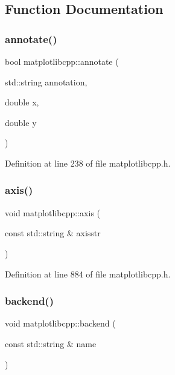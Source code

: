 \subsection{Function Documentation}
\mbox{\label{namespacematplotlibcpp_a4854fc237468144bd46809ea7ce8f2a0}} 
\subsubsection{\texorpdfstring{annotate()}{annotate()}}
{\footnotesize\ttfamily bool matplotlibcpp\+::annotate (\begin{DoxyParamCaption}\item[{std\+::string}]{annotation,  }\item[{double}]{x,  }\item[{double}]{y }\end{DoxyParamCaption})\hspace{0.3cm}{\ttfamily [inline]}}



Definition at line 238 of file matplotlibcpp.\+h.

\mbox{\label{namespacematplotlibcpp_aab5287e30ebd90df0f5614d8da0f5291}} 
\subsubsection{\texorpdfstring{axis()}{axis()}}
{\footnotesize\ttfamily void matplotlibcpp\+::axis (\begin{DoxyParamCaption}\item[{const std\+::string \&}]{axisstr }\end{DoxyParamCaption})\hspace{0.3cm}{\ttfamily [inline]}}



Definition at line 884 of file matplotlibcpp.\+h.

\mbox{\label{namespacematplotlibcpp_a7c176020a3312c69b4af6fa80113e53b}} 
\subsubsection{\texorpdfstring{backend()}{backend()}}
{\footnotesize\ttfamily void matplotlibcpp\+::backend (\begin{DoxyParamCaption}\item[{const std\+::string \&}]{name }\end{DoxyParamCaption})\hspace{0.3cm}{\ttfamily [inline]}}



